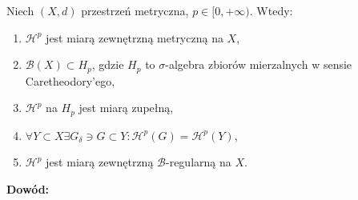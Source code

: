 \begin{tw}
	Niech $(X,d)$ przestrzeń metryczna, $p \in [0, +\infty)$. Wtedy:
	\begin{enumerate}
		\item $\mathcal{H}^p$ jest miarą zewnętrzną metryczną na $X$,
		\item $\mathcal{B}(X) \subset H_p$, gdzie $H_p$ to $\sigma$-algebra zbiorów mierzalnych w sensie Caretheodory'ego,
		\item $\mathcal{H}^p$ na $H_p$ jest miarą zupełną,
		\item $\forall Y \subset X \exists G_{\delta} \ni G \subset Y: \mathcal{H}^p(G) = \mathcal{H}^p(Y)$,
		\item $\mathcal{H}^p$ jest miarą zewnętrzną $\mathcal{B}$-regularną na $X$.
	\end{enumerate}

	\textbf{Dowód:} \citep[AM4, 2.51]{Tworzewski}
\end{tw}
